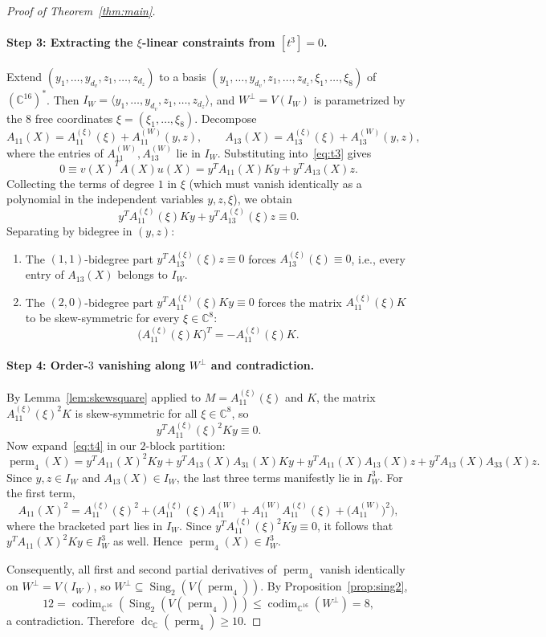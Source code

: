 \documentclass[11pt,a4paper]{article}
\theoremstyle{definition}
\DeclareMathOperator{\perm}{perm}
\DeclareMathOperator{\dc}{dc}
\DeclareMathOperator{\codim}{codim}
\DeclareMathOperator{\Sing}{Sing}
\begin{document}
\begin{proof}[Proof of Theorem~\ref{thm:main}]
\paragraph{Step 3: Extracting the $\xi$-linear constraints from $[t^3] = 0$.}
Extend $(y_1,\dots,y_{d_v}, z_1,\dots,z_{d_z})$ to a basis $(y_1,\dots,y_{d_v}, z_1,\dots,z_{d_z}, \xi_1,\dots,\xi_8)$ of $(\mathbb{C}^{16})^*$. Then $I_W = \langle y_1,\dots,y_{d_v}, z_1,\dots,z_{d_z} \rangle$, and $W^\perp = V(I_W)$ is parametrized by the $8$ free coordinates $\xi = (\xi_1,\dots,\xi_8)$. Decompose
\[
  A_{11}(X) = A_{11}^{(\xi)}(\xi) + A_{11}^{(W)}(y,z), \qquad
  A_{13}(X) = A_{13}^{(\xi)}(\xi) + A_{13}^{(W)}(y,z),
\]
where the entries of $A_{11}^{(W)}, A_{13}^{(W)}$ lie in $I_W$. Substituting into~\eqref{eq:t3} gives
\[
  0 \equiv v(X)^T A(X) u(X) = y^T A_{11}(X) K y + y^T A_{13}(X) z.
\]
Collecting the terms of degree $1$ in $\xi$ (which must vanish identically as a polynomial in the independent variables $y, z, \xi$), we obtain
\[
  y^T A_{11}^{(\xi)}(\xi) K y + y^T A_{13}^{(\xi)}(\xi) z \equiv 0.
\]
Separating by bidegree in $(y, z)$:
\begin{enumerate}
  \item The $(1,1)$-bidegree part $y^T A_{13}^{(\xi)}(\xi) z \equiv 0$ forces $A_{13}^{(\xi)}(\xi) \equiv 0$, i.e., every entry of $A_{13}(X)$ belongs to $I_W$.
  \item The $(2,0)$-bidegree part $y^T A_{11}^{(\xi)}(\xi) K y \equiv 0$ forces the matrix $A_{11}^{(\xi)}(\xi) K$ to be skew-symmetric for every $\xi \in \mathbb{C}^8$:
  \[
    \big(A_{11}^{(\xi)}(\xi) K\big)^T = -A_{11}^{(\xi)}(\xi) K.
  \]
\end{enumerate}

\paragraph{Step 4: Order-$3$ vanishing along $W^\perp$ and contradiction.}
By Lemma~\ref{lem:skewsquare} applied to $M = A_{11}^{(\xi)}(\xi)$ and $K$, the matrix $A_{11}^{(\xi)}(\xi)^2 K$ is skew-symmetric for all $\xi \in \mathbb{C}^8$, so
\[
  y^T A_{11}^{(\xi)}(\xi)^2 K y \equiv 0.
\]
Now expand~\eqref{eq:t4} in our $2$-block partition:
\[
  \perm_4(X) = y^T A_{11}(X)^2 K y + y^T A_{13}(X) A_{31}(X) K y + y^T A_{11}(X) A_{13}(X) z + y^T A_{13}(X) A_{33}(X) z.
\]
Since $y, z \in I_W$ and $A_{13}(X) \in I_W$, the last three terms manifestly lie in $I_W^3$. For the first term,
\[
  A_{11}(X)^2 = A_{11}^{(\xi)}(\xi)^2 + \Big(A_{11}^{(\xi)}(\xi) A_{11}^{(W)} + A_{11}^{(W)} A_{11}^{(\xi)}(\xi) + \big(A_{11}^{(W)}\big)^2\Big),
\]
where the bracketed part lies in $I_W$. Since $y^T A_{11}^{(\xi)}(\xi)^2 K y \equiv 0$, it follows that $y^T A_{11}(X)^2 K y \in I_W^3$ as well. Hence $\perm_4(X) \in I_W^3$.

Consequently, all first and second partial derivatives of $\perm_4$ vanish identically on $W^\perp = V(I_W)$, so $W^\perp \subseteq \Sing_2(V(\perm_4))$. By Proposition~\ref{prop:sing2},
\[
  12 = \codim_{\mathbb{C}^{16}}(\Sing_2(V(\perm_4))) \le \codim_{\mathbb{C}^{16}}(W^\perp) = 8,
\]
a contradiction. Therefore $\dc_{\mathbb{C}}(\perm_4) \ge 10$.
\end{proof}
\end{document}
